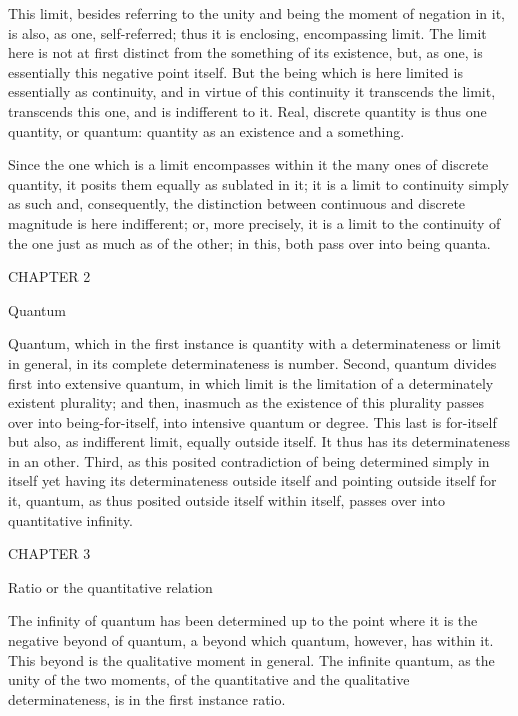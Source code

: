 This limit, besides referring to the unity
and being the moment of negation in it,
is also, as one, self-referred;
thus it is enclosing, encompassing limit.
The limit here is not at first distinct
from the something of its existence,
but, as one, is essentially this negative point itself.
But the being which is here limited is essentially as continuity,
and in virtue of this continuity it transcends the limit,
transcends this one, and is indifferent to it.
Real, discrete quantity is thus one quantity, or quantum:
quantity as an existence and a something.

Since the one which is a limit encompasses
within it the many ones of discrete quantity,
it posits them equally as sublated in it;
it is a limit to continuity simply as such
and, consequently, the distinction between
continuous and discrete magnitude is here indifferent;
or, more precisely, it is a limit to
the continuity of the one
just as much as of the other;
in this, both pass over into being quanta.

CHAPTER 2

Quantum

Quantum, which in the first instance is quantity
with a determinateness or limit in general,
in its complete determinateness is number.
Second, quantum divides first into extensive quantum,
in which limit is the limitation of
a determinately existent plurality;
and then, inasmuch as the existence of
this plurality passes over into being-for-itself,
into intensive quantum or degree.
This last is for-itself but also,
as indifferent limit, equally outside itself.
It thus has its determinateness in an other.
Third, as this posited contradiction of
being determined simply in itself
yet having its determinateness outside itself
and pointing outside itself for it,
quantum, as thus posited outside itself within itself,
passes over into quantitative infinity.

CHAPTER 3

Ratio or the quantitative relation

The infinity of quantum has been determined up to
the point where it is the negative beyond of quantum,
a beyond which quantum, however, has within it.
This beyond is the qualitative moment in general.
The infinite quantum, as the unity of the two moments,
of the quantitative and the qualitative determinateness,
is in the first instance ratio.

